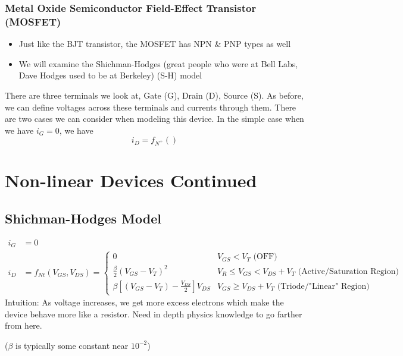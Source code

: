 \documentclass{report}
\begin{document}

\subsection{Metal Oxide Semiconductor Field-Effect Transistor (MOSFET)}
\begin{itemize}
    \item Just like the BJT transistor, the MOSFET has NPN \& PNP types as well
    \item We will examine the Shichman-Hodges (great people who were at Bell Labs, Dave Hodges used to be at Berkeley) (S-H) model
\end{itemize} 
There are three terminals we look at, Gate (G), Drain (D), Source (S). As before, we can define voltages across these terminals and currents through them.
There are two cases we can consider when modeling this device. In the simple case when we have $i_G = 0$, we have
\begin{equation*}
    i_D = f_{N^+}() %
\end{equation*}

\chapter{Non-linear Devices Continued}
\section{Shichman-Hodges Model}
\begin{align*}
    i_G &= 0 \\
    i_D &= f_{Nt} (V_{GS}, V_{DS}) = 
    \begin{cases}
        0 & V_{GS} < V_T \text{ (OFF)}\\ 
        \frac{\beta}{2} (V_{GS} - V_T)^2 & V_R \leq V_{GS} < V_{DS} + V_T \text{ (Active/Saturation Region)}\\
        \beta [(V_{GS} - V_T) - \frac{V_{DS}}{2}]V_{DS} & V_{GS} \geq V_{DS} + V_T \text{ (Triode/"Linear" Region)}
    \end{cases}
\end{align*}
Intuition: As voltage increases, we get more excess electrons which make the device behave more like a resistor. Need in depth physics knowledge to go farther from here.

($\beta$ is typically some constant near $10^{-2}$)
\end{document}
